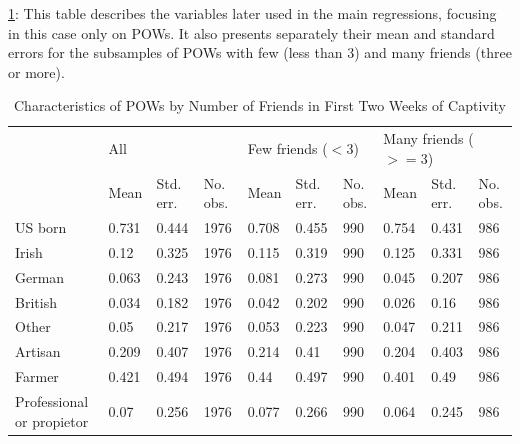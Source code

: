 \documentclass[a4paper]{report}\usepackage{graphicx, color}
\begin{document}
\begin{refsection}
\ref{friends}: This table describes the variables later used in the main regressions, focusing in this case only on POWs.  It also presents separately their mean and standard errors for the subsamples of POWs with few (less than 3) and many friends (three or more). 

\begin{table}
\caption{Characteristics of POWs by Number of Friends in First Two Weeks of Captivity}
\label{friends}
\begin{tabular}{llllllllll}

                                  & \multicolumn{3}{l}{All} & \multicolumn{3}{l}{Few friends ($<3$)} & \multicolumn{3}{l}{Many friends ($>=3$)} \\
                                  & Mean                    & Std. err.                            & No. obs.                               & Mean & Std. err. & No. obs. & Mean & Std. err. & No. obs. \\
US born                           & 0.731                   & 0.444                                & 1976                                   & 0.708 & 0.455 & 990 & 0.754 & 0.431 & 986 \\
Irish                             & 0.12                    & 0.325                                & 1976                                   & 0.115 & 0.319 & 990 & 0.125 & 0.331 & 986 \\
German                            & 0.063                   & 0.243                                & 1976                                   & 0.081 & 0.273 & 990 & 0.045 & 0.207 & 986 \\
British                           & 0.034                   & 0.182                                & 1976                                   & 0.042 & 0.202 & 990 & 0.026 & 0.16 & 986 \\
Other                             & 0.05                    & 0.217                                & 1976                                   & 0.053 & 0.223 & 990 & 0.047 & 0.211 & 986 \\
Artisan                           & 0.209                   & 0.407                                & 1976                                   & 0.214 & 0.41 & 990 & 0.204 & 0.403 & 986 \\
Farmer                            & 0.421                   & 0.494                                & 1976                                   & 0.44 & 0.497 & 990 & 0.401 & 0.49 & 986 \\
Professional or propietor         & 0.07                    & 0.256                                & 1976                                   & 0.077 & 0.266 & 990 & 0.064 & 0.245 & 986 \\

\end{tabular}
\end{table}
\end{refsection}
\end{document}
